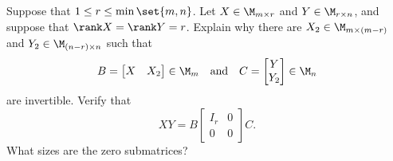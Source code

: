 \documentclass{homework}
\begin{document}
\begin{problem}[P.3.16]
  Suppose that \(1 \le r \le \min\set{m,n}\).  Let
  \(X \in \M_{m\times r}\) and \(Y \in \M_{r\times n}\), and suppose
  that \(\rank X = \rank Y = r\).  Explain why there are
  \(X_2 \in \M_{m\times(m-r)}\) and \(Y_2 \in \M_{(n-r)\times n}\) such
  that
  \[
    B = \begin{bmatrix}X&X_2\end{bmatrix} \in \M_m
    \quad\text{and}\quad C = \begin{bmatrix}Y\\Y_2\end{bmatrix} \in
    \M_n
  \]
  are invertible.  Verify that
  \[
    XY = B \begin{bmatrix}I_r&0\\0&0\end{bmatrix} C.
  \]
  What sizes are the zero submatrices?

  \begin{solution}
  \end{solution}

\end{problem}
\end{document}
